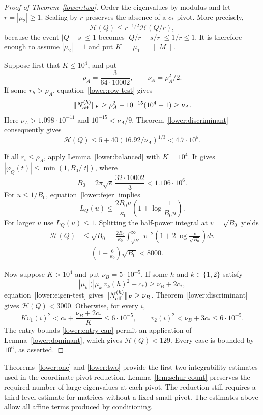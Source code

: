 \begin{proof}[Proof of Theorem~\ref{lower:two}]
Order the eigenvalues by modulus and let $r=|\mu_2|\geq1$.
Scaling by $r$ preserves the absence of a $c_*$-pivot.  More
precisely,
\[
 \mathcal H(Q)\leq r^{-1/2}\mathcal H(Q/r),
\]
because the event $|Q-s|\leq1$ becomes
$|Q/r-s/r|\leq1/r\leq1$.
It is therefore enough to assume $|\mu_2|=1$ and put
$K=|\mu_1|=\|M\|$.

Suppose first that $K\leq10^4$, and put
\[
 \rho_A=\frac3{64\cdot10002},
 \qquad \nu_A=\rho_A^2/2.
\]
If some $r_h>\rho_A$, equation~\eqref{lower:row-test} gives
\[
 \|N^{(h)}_{\rm off}\|_F
 \geq\rho_A^2-10^{-15}(10^4+1)\geq\nu_A.
\]
Here $\nu_A>1.098\cdot10^{-11}$ and $10^{-15}<\nu_A/9$.
Theorem~\ref{lower:discriminant} consequently gives
\[
 \mathcal H(Q)\leq5+40(16.92/\nu_A)^{1/3}<4.7\cdot10^5.
\]

If all $r_i\leq\rho_A$, apply Lemma~\ref{lower:balanced} with
$K=10^4$.  It gives $|\varphi_Q(t)|\leq\min(1,B_0/|t|)$, where
\[
 B_0=2\pi\sqrt e\,\frac{32\cdot10002}{3}<1.106\cdot10^6.
\]
For $u\leq1/B_0$, equation~\eqref{lower:fejer} implies
\[
 L_Q(u)\leq\frac{2B_0u}{\kappa_0}
                   \left(1+\log\frac1{B_0u}\right).
\]
For larger $u$ use $L_Q(u)\leq1$.  Splitting the half-power
integral at $v=\sqrt{B_0}$ yields
\begin{align*}
 \mathcal H(Q)
 &\leq\sqrt{B_0}+
 \frac{2B_0}{\kappa_0}\int_{\sqrt{B_0}}^\infty
 v^{-2}\left(1+2\log\frac v{\sqrt{B_0}}\right)dv\\
 &=\left(1+\frac6{\kappa_0}\right)\sqrt{B_0}<8000.
\end{align*}

Now suppose $K>10^4$ and put $\nu_B=5\cdot10^{-5}$.
If some $h$ and $k\in\{1,2\}$ satisfy
\[
 |\mu_k|\bigl(|\mu_k|v_k(h)^2-c_*\bigr)
                      \geq\nu_B+2c_*,
\]
equation~\eqref{lower:eigen-test} gives
$\|N^{(h)}_{\rm off}\|_F\geq\nu_B$.
Theorem~\ref{lower:discriminant} gives $\mathcal H(Q)<3000$.
Otherwise, for every $i$,
\[
 K v_1(i)^2<c_*+\frac{\nu_B+2c_*}{K}\leq6\cdot10^{-5},
 \qquad v_2(i)^2<\nu_B+3c_*\leq6\cdot10^{-5}.
\]
The entry bounds \eqref{lower:entry-cap} permit an application of
Lemma~\ref{lower:dominant}, which gives $\mathcal H(Q)<129$.
Every case is bounded by $10^6$, as asserted.
\end{proof}

Theorems~\ref{lower:one} and \ref{lower:two} provide the first two
integrability estimates used in the coordinate-pivot reduction.
Lemma~\ref{lem:schur-count} preserves the required number of large
eigenvalues at each pivot.  The reduction still requires a third-level
estimate for matrices without a fixed small pivot.  The estimates above
allow all affine terms produced by conditioning.
